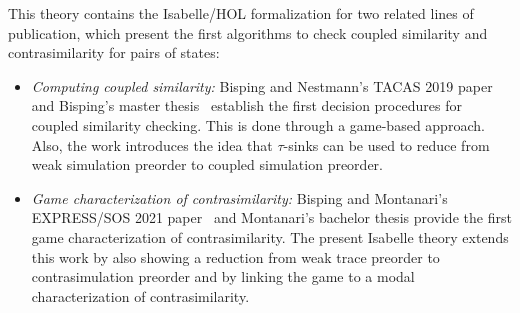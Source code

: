 \documentclass[10pt,a4paper]{article}
\begin{document}
This theory contains the Isabelle/HOL formalization for two related lines of publication, which present
the first algorithms to check coupled similarity and contrasimilarity for pairs of states:

\begin{itemize}
  \item \emph{Computing coupled similarity:} Bisping and Nestmann's TACAS 2019 paper~%
    \cite{bn2019coupledsimTacas} and Bisping's master thesis~\cite{bisping2018coupledsim}
    establish the first decision procedures for coupled similarity checking.
    This is done through a game-based approach.
    Also, the work introduces the idea that $\tau$-sinks can be used to reduce from weak simulation
    preorder to coupled simulation preorder.
  \item \emph{Game characterization of contrasimilarity:} Bisping and Montanari's
    EXPRESS/SOS 2021 paper~\cite{bm2021contrasimilarity} and Montanari's bachelor thesis provide
    the first game characterization of contrasimilarity.
    The present Isabelle theory extends this work by also showing a reduction from weak trace preorder to
    contrasimulation preorder and by linking the game to a modal characterization of contrasimilarity.
\end{itemize}
\end{document}

